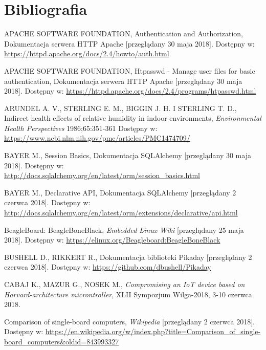 \documentclass[a4paper,11pt,twoside]{article}
\begin{document}
  

\newpage
\section{Bibliografia}
\begin{thebibliography}{9}

\uppercase{Apache Software Foundation}, Authentication and Authorization, Dokumentacja serwera HTTP Apache [przeglądany 30 maja 2018].
Dostępny w: \url{https://httpd.apache.org/docs/2.4/howto/auth.html}

\uppercase{Apache Software Foundation}, Htpasswd - Manage user files for basic authentication, Dokumentacja serwera HTTP Apache [przeglądany 30 maja 2018].
Dostępny w: \url{https://httpd.apache.org/docs/2.4/programs/htpasswd.html}

\uppercase{Arundel A. V., Sterling E. M., Biggin J. H. i Sterling T. D.}, Indirect health effects of relative humidity in indoor environments, \textit{Environmental Health Perspectives} 1986;65:351-361
Dostępny w: \url{https://www.ncbi.nlm.nih.gov/pmc/articles/PMC1474709/}

\uppercase{Bayer M.}, Session Basics, Dokumentacja SQLAlchemy [przeglądany 30 maja 2018].
Dostępny w: \url{http://docs.sqlalchemy.org/en/latest/orm/session_basics.html}

\uppercase{Bayer M.}, Declarative API, Dokumentacja SQLAlchemy [przeglądany 2 czerwca 2018].
Dostępny w: \url{http://docs.sqlalchemy.org/en/latest/orm/extensions/declarative/api.html}

BeagleBoard: BeagleBoneBlack, \textit{Embedded Linux Wiki} [przeglądany 25 maja 2018].
Dostępny w: \url{https://elinux.org/Beagleboard:BeagleBoneBlack}

\uppercase{Bushell D., Rikkert R.}, Dokumentacja biblioteki Pikaday [przeglądany 2 czerwca 2018].
Dostępny w: \url{https://github.com/dbushell/Pikaday}

\uppercase{Cabaj K., Mazur G., Nosek M.}, \textit{Compromising an IoT device based on Harvard-architecture microntroller}, XLII Sympozjum Wilga-2018, 3-10 czerwca 2018.

Comparison of single-board computers, \textit{Wikipedia} [przeglądany 2 czerwca 2018].
Dostępny w: \url{https://en.wikipedia.org/w/index.php?title=Comparison_of_single-board_computers&oldid=843993327}


\end{thebibliography}
\end{document}
